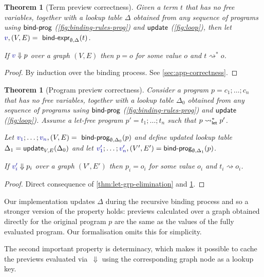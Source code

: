 \documentclass[english,crc,references=cleveref]{programming}
\newcounter{thc}
\theoremstyle{plain}
\newtheorem{theorem}[thc]{Theorem}
\theoremstyle{definition}
\newcommand{\ident}[1]{\textnormal{\textcolor{idclr}{\sffamily #1}}}
\newcommand{\bndclr}[1]{\textcolor{kvdclr}{#1}}
\begin{document}
\begin{theorem}[Term preview correctness]
\label{thm:let-free-correct}
Given a term $t$ that has no free variables, together with a lookup table $\Delta$ obtained
from any sequence of programs using $\ident{bind-prog}$ (\cref{fig:binding-rules-prog}) and
$\ident{update}$ (\cref{fig:loop}), then
let $\bndclr{v}, (V, E) = \ident{bind-expr}_{\emptyset, \Delta}(t)$.


If $\bndclr{v}\Downarrow p$
over a graph $(V, E)$ then $p = o$ for some value $o$ and $t \rightsquigarrow^{*} o$.
\end{theorem}

\begin{proof}
By induction over the binding process. See \cref{sec:app-correctness}.
\end{proof}

\begin{theorem}[Program preview correctness]
\label{thm:correcntess}
Consider a program $p=c_1;\ldots;c_n$ that has no free variables, together with a lookup table
$\Delta_0$ obtained from any sequence of programs using $\ident{bind-prog}$
(\cref{fig:binding-rules-prog}) and $\ident{update}$ (\cref{fig:loop}). Assume a
let-free program $p'=t_1;\ldots;t_n$ such that $p\rightsquigarrow^{*}_\ident{let}p'$.

\begin{sloppypar}
Let $\bndclr{v_1};\ldots;\bndclr{v_n}, (V, E) = \ident{bind-prog}_{\emptyset, \Delta_0}(p)$
 and define updated lookup table $\Delta_1=\ident{update}_{V, E}(\Delta_0)$ and
let $\bndclr{v'_1};\ldots;\bndclr{v'_n}, (V', E') = \ident{bind-prog}_{\emptyset, \Delta_1}(p)$.
\end{sloppypar}

If $\bndclr{v'_i}\Downarrow p_i$ over a graph $(V', E')$ then $p_i=o_i$ for some value $o_i$ and
$t_i \rightsquigarrow o_i$.
\end{theorem}
\begin{proof}
Direct consequence of \cref{thm:let-grp-elimination} and \cref{thm:let-free-correct}.
\end{proof}
%
%
Our implementation updates $\Delta$ during the recursive binding process and so a stronger version
of the property holds: previews calculated over a graph obtained directly for the original program
$p$ are the same as the values of the fully evaluated program. Our formalisation omits this for
simplicity.

The second important property is determinacy, which makes it possible to cache the previews
evaluated via~$\Downarrow$ using the corresponding graph node as a lookup key.
\end{document}
